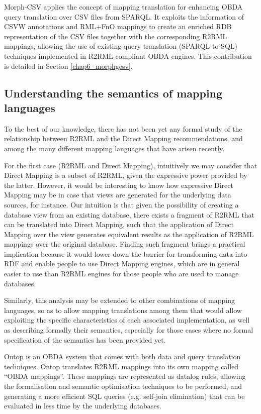 Morph-CSV applies the concept of mapping translation for enhancing OBDA query translation over CSV files from SPARQL. It exploits the information of CSVW annotations and RML+FnO mappings to create an enriched RDB representation of the CSV files together with the corresponding R2RML mappings, allowing the use of existing query translation (SPARQL-to-SQL) techniques implemented in R2RML-compliant OBDA engines. This contribution is detailed in Section \ref{chap6_morphgcsv}.


\subsection{Understanding the semantics of mapping languages}
To the best of our knowledge, there has not been yet any formal study of the relationship between R2RML and the Direct Mapping recommendations, and among the many different mapping languages that have arisen recently.

For the first case (R2RML and Direct Mapping), intuitively we may consider that Direct Mapping is a subset of R2RML, given the expressive power provided by the latter. However, it would be interesting to know how expressive Direct Mapping may be in case that views are generated for the underlying data sources, for instance. Our intuition is that given the possibility of creating a database view from an existing database, there exists a fragment of R2RML that can be translated into Direct Mapping, such that the application of Direct Mapping over the view generates equivalent results as the application of R2RML mappings over the original database. Finding such fragment brings a practical implication because it would lower down the barrier for transforming data into RDF and enable people to use Direct Mapping engines, which are in general easier to use than R2RML engines for those people who are used to manage databases.

Similarly, this analysis may be extended to other combinations of mapping languages, so as to allow mapping translations among them that would allow exploiting the specific characteristics of each associated implementation, as well as describing formally their semantics, especially for those cases where no formal specification of the semantics has been provided yet.

Ontop \citep{rodriguez2015efficient} is an OBDA system that comes with both data and query translation techniques. Ontop translates R2RML mappings into its own mapping called ``OBDA mappings''. These mappings are represented as datalog rules, allowing the formalisation and semantic optimisation techniques to be performed, and generating a more efficient SQL queries (e.g. self-join elimination) that can be evaluated in less time by the underlying databases.



